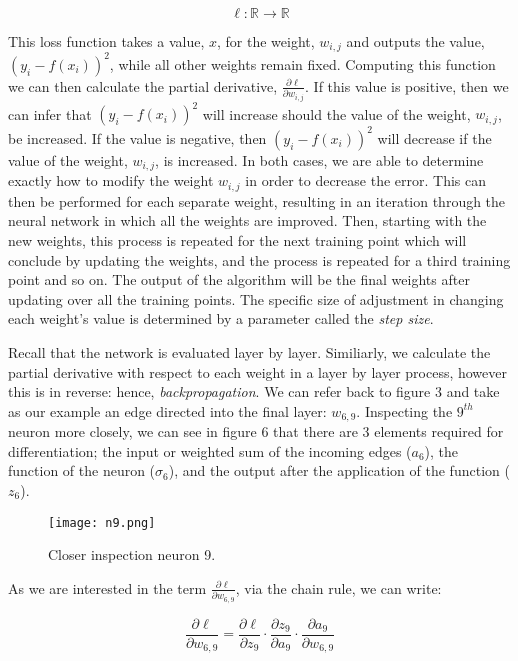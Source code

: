 \documentclass[11pt]{article}
\begin{document}
\begin{equation}\ell: \mathbb{R} \to \mathbb{R} \nonumber\end{equation}

This loss function takes a value, $x$, for the weight, $w_{i,j}$ and outputs the value, $(y_{i}-f(x_{i}))^2$, while all other weights remain fixed. Computing this function we can then calculate the partial derivative, $\frac{\partial\ell }{\partial w_{i,j}}$. If this value is positive, then we can infer that $(y_{i}-f(x_{i}))^2$ will increase should the value of the weight, $w_{i, j}$, be increased. If the value is negative, then $(y_{i}-f(x_{i}))^2$ will decrease if the value of the weight, $w_{i, j}$, is increased. In both cases, we are able to determine exactly how to modify the weight $w_{i,j}$ in order to decrease the error. This can then be performed for each separate weight, resulting in an iteration through the neural network in which all the weights are improved. Then, starting with the new weights, this process is repeated for the next training point which will conclude by updating the weights, and the process is repeated for a third training point and so on. The output of the algorithm will be the final weights after updating over all the training points. The specific size of adjustment in changing each weight's value is determined by a parameter called the \textit{step size}. 

Recall that the network is evaluated layer by layer. Similiarly, we calculate the partial derivative with respect to each weight in a layer by layer process, however this is in reverse: hence, \textit{backpropagation}. We can refer back to figure 3 and take as our example an edge directed into the final layer: $w_{6,9}$. Inspecting the $9^{th}$ neuron more closely, we can see in figure 6 that there are 3 elements required for differentiation; the input or weighted sum of the incoming edges ($a_{6}$), the function of the neuron ($\sigma_{6}$), and the output after the application of the function ($z_{6}$).

\begin{figure}[h]
    \centering
    \texttt{[image: n9.png]}
    \caption{Closer inspection neuron 9.}   
\end{figure}

As we are interested in the term $\frac{\partial\ell }{\partial w_{6,9}}$, via the chain rule, we can write:

\begin{equation}\frac{\partial\ell }{\partial w_{6,9}} = \frac{\partial\ell }{\partial z_{9}} \cdot \frac{\partial z_{9} }{\partial a_{9}} \cdot \frac{\partial a_{9} }{\partial w_{6,9}} \nonumber\end{equation}
\end{document}

